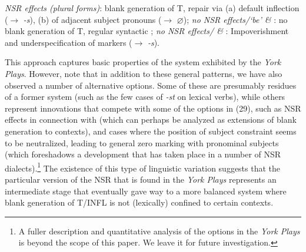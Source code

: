 \documentclass[output=paper]{langsci/langscibook}
\begin{document}
\ea
\ea \textit{\gls{NSR} effects (plural forms)}: blank generation of T, repair via (a) default inflection ($\rightarrow$ \emph{-s}), (b)  of adjacent subject pronouns ($\rightarrow$ $\varnothing$);
\ex \textit{no \gls{NSR} effects/`be' \& \Fsg{}}: no blank generation of T, regular syntactic ;
\ex \textit{no \gls{NSR} effects/\Ssg{} \& \Tsg{}}:
Impoverishment and underspecification of markers
($\rightarrow$ \emph{-s}).
\z
\z

This approach captures basic properties of the  system exhibited by
the \emph{York Plays}. However, note that in addition to these general
patterns, we have also observed a number of alternative  options. Some
of these are presumably residues of a former system (such as the few cases of
\Ssg{} \emph{-st} on lexical verbs), while others represent innovations that
compete with some of the options in (29), such as \gls{NSR} effects in
connection with \Fsg{} (which can perhaps be analyzed as extensions of blank
generation to \Fsg{} contexts), and cases where the position of subject
constraint seems to be neutralized, leading to general zero marking with
pronominal subjects (which foreshadows a development that has taken place in a
number of \gls{NSR} dialects).\footnote{A fuller description and quantitative
    analysis of the  options in the \emph{York Plays} is beyond the scope
of this paper. We leave it for future investigation.} The existence of this
type of linguistic variation suggests that the particular version of the
\gls{NSR} that is found in the \emph{York Plays} represents an intermediate
stage that eventually gave way to a more balanced  system where blank
generation of T/INFL is not (lexically) confined to certain contexts.

\end{document}
